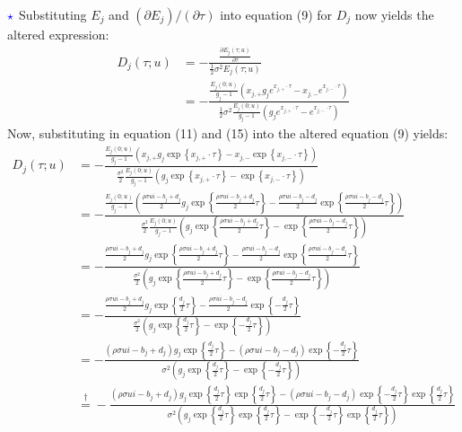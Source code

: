 \documentclass[12pt]{article}
\numberwithin{equation}{section}
\begin{document}
$\textcolor{blue}{\star}$ Substituting $E_j$ and $(\partial E_j)/(\partial
\tau)$ into equation (9) for $D_j$
now yields the altered expression:
\begin{align*}
    D_j(\tau;u)&=-\frac{\frac{\partial E_j(\tau;u)}{\partial \tau}}{\frac{1}{2}\sigma^2E_j(\tau;u)}\\
    &=-\frac{\frac{E_j(0;u)}{g_j-1}\left (x_{j,+}g_je^{x_{j,+}\cdot \tau} -x_{j,-}e^{x_{j,-}\cdot \tau}\right )}{\frac{1}{2}\sigma^2 \frac{E_j(0;u)}{g_j-1}\left ( g_je^{x_{j,+}\cdot \tau}-e^{x_{j,-}\cdot \tau}\right )}
\end{align*}
Now, substituting in equation (11) and (15) into the altered equation (9) yields:
\begin{align*}
    D_j(\tau ; u)&=-\frac{\frac{E_j(0 ; u)}{g_j-1}\left(x_{j,+} g_j \exp\left\{x_{j,+} \cdot \tau\right\}-x_{j,-} \exp\left\{x_{j,-} \cdot \tau\right\}\right)}{\frac{\sigma^2}{2} \frac{E_j(0;u)}{g_j-1}\left(g_j \exp\left\{x_{j,+} \cdot \tau\right\}-\exp\left\{x_{j,-} \cdot \tau\right\}\right)} \\
    & =-\frac{\frac{E_j(0 ; u)}{g_j-1}\left(\frac{\rho \sigma u i-b_j+d_j}{2} g_j \exp\left\{\frac{\rho \sigma u i-b_j+d_j}{2} \tau\right\}-\frac{\rho \sigma u i-b_j-d_j}{2} \exp\left\{\frac{\rho \sigma u i-b_j-d_j}{2} \tau\right\}\right)}{\frac{\sigma^2}{2} \frac{E_j(0 ; u)}{g_j-1}\left(g_j \exp\left\{\frac{\rho \sigma u i-b_j+d_j}{2} \tau\right\}-\exp\left\{\frac{\rho \sigma u i-b_j-d_j}{2} \tau\right\}\right)} \\
    & =-\frac{\frac{\rho \sigma u i-b_j+d_j}{2} g_j \exp\left\{\frac{\rho \sigma u i-b_j+d_j}{2} \tau\right\}-\frac{\rho \sigma u i-b_j-d_j}{2} \exp\left\{\frac{\rho \sigma u i-b_j-d_j}{2} \tau\right\}}{\frac{\sigma^2}{2}\left(g_j \exp\left\{\frac{\rho \sigma u i-b_j+d_j}{2} \tau\right\}-\exp\left\{\frac{\rho \sigma u i-b_j-d_j}{2} \tau\right\}\right)} \\
    & =-\frac{\frac{\rho \sigma u i-b_j+d_j}{2} g_j \exp\left\{\frac{d_j}{2} \tau\right\}-\frac{\rho \sigma u i-b_j-d_j}{2} \exp\left\{-\frac{d_j}{2} \tau\right\}}{\frac{\sigma^2}{2}\left(g_j \exp\left\{\frac{d_j}{2} \tau\right\}-\exp\left\{-\frac{d_j}{2} \tau\right\}\right)} \\
    & =-\frac{\left(\rho \sigma u i-b_j+d_j\right) g_j \exp\left\{\frac{d_j}{2} \tau\right\}-\left(\rho \sigma u i-b_j-d_j\right) \exp\left\{-\frac{d_j}{2} \tau\right\}}{\sigma^2\left(g_j \exp\left\{\frac{d_j}{2} \tau\right\}-\exp\left\{-\frac{d_j}{2} \tau\right\}\right)} \\
    & \overset{\dagger}{=}-\frac{\left(\rho \sigma u i-b_j+d_j\right) g_j \exp\left\{\frac{d_j}{2} \tau\right\} \exp\left\{\frac{d_j}{2} \tau\right\}-\left(\rho \sigma u i-b_j-d_j\right) \exp\left\{-\frac{d_j}{2} \tau\right\} \exp\left\{\frac{d_j}{2} \tau\right\}}{\sigma^2\left(g_j \exp\left\{\frac{d_j}{2} \tau\right\} \exp\left\{\frac{d_j}{2} \tau\right\}-\exp\left\{-\frac{d_j}{2} \tau\right\} \exp\left\{\frac{d_j}{2} \tau\right\}\right)} \\

\end{align*}
\end{document}
